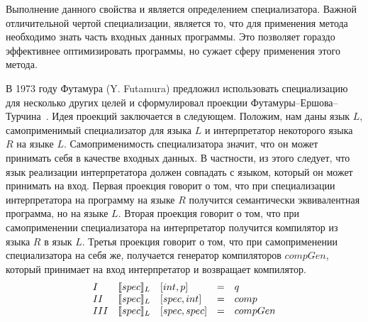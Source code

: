Выполнение данного свойства и является определением специализатора. Важной отличительной чертой специализации, является то, что для применения метода необходимо знать часть входных данных программы. Это позволяет гораздо эффективнее оптимизировать программы, но сужает сферу применения этого метода.

В 1973 году Футамура (Y. Futamura) предложил использовать специализацию для несколько других целей и сформулировал проекции Футамуры--Ершова--Турчина~\cite{Futa}. Идея проекций заключается в следующем. Положим, нам даны язык $L$, самоприменимый специализатор для языка $L$ и интерпретатор некоторого языка $R$ на языке $L$. Самоприменимость специализатора значит, что он может принимать себя в качестве входных данных. В частности, из этого следует, что язык реализации интерпретатора должен совпадать с языком, который он может принимать на вход. Первая проекция говорит о том, что при специализации интерпретатора на программу на языке $R$ получится семантически эквивалентная программа, но на языке $L$. Вторая проекция говорит о том, что при самоприменении специализатора на интерпретатор получится компилятор из языка $R$ в язык $L$. Третья проекция говорит о том, что при самоприменении специализатора на себя же, получается генератор компиляторов $compGen$, который принимает на вход интерпретатор и возвращает компилятор.
    $$
    \begin{array}{l l l c l}
      I & \llbracket spec \rrbracket_L &[int, p] &= &q\\
      II & \llbracket spec \rrbracket_L &[spec, int] &= &comp\\
      III & \llbracket spec \rrbracket_L &[spec, spec] &= &compGen
    \end{array}$$  

